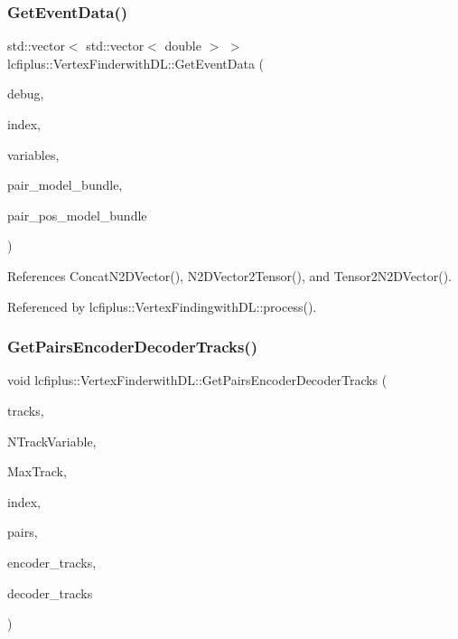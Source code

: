 \mbox{\label{namespacelcfiplus_1_1VertexFinderwithDL_a719656476002b2e8d4b42cecc8cee36d}} 
\subsubsection{Get\+Event\+Data()}
{\footnotesize\ttfamily std\+::vector$<$ std\+::vector$<$ double $>$ $>$ lcfiplus\+::\+Vertex\+Finderwith\+D\+L\+::\+Get\+Event\+Data (\begin{DoxyParamCaption}\item[{bool}]{debug,  }\item[{std\+::vector$<$ std\+::vector$<$ double $>$ $>$}]{index,  }\item[{std\+::vector$<$ std\+::vector$<$ double $>$ $>$}]{variables,  }\item[{tensorflow\+::\+Saved\+Model\+Bundle\+Lite \&}]{pair\+\_\+model\+\_\+bundle,  }\item[{tensorflow\+::\+Saved\+Model\+Bundle\+Lite \&}]{pair\+\_\+pos\+\_\+model\+\_\+bundle }\end{DoxyParamCaption})}



References Concat\+N2\+D\+Vector(), N2\+D\+Vector2\+Tensor(), and Tensor2\+N2\+D\+Vector().



Referenced by lcfiplus\+::\+Vertex\+Findingwith\+D\+L\+::process().

\mbox{\label{namespacelcfiplus_1_1VertexFinderwithDL_ab6f640b872cf305e92307523107e045e}} 
\subsubsection{Get\+Pairs\+Encoder\+Decoder\+Tracks()}
{\footnotesize\ttfamily void lcfiplus\+::\+Vertex\+Finderwith\+D\+L\+::\+Get\+Pairs\+Encoder\+Decoder\+Tracks (\begin{DoxyParamCaption}\item[{\textbf{ Track\+Vec} \&}]{tracks,  }\item[{int}]{N\+Track\+Variable,  }\item[{int}]{Max\+Track,  }\item[{std\+::vector$<$ std\+::vector$<$ double $>$ $>$ \&}]{index,  }\item[{std\+::vector$<$ std\+::vector$<$ double $>$ $>$ \&}]{pairs,  }\item[{std\+::vector$<$ std\+::vector$<$ double $>$ $>$ \&}]{encoder\+\_\+tracks,  }\item[{std\+::vector$<$ std\+::vector$<$ double $>$ $>$ \&}]{decoder\+\_\+tracks }\end{DoxyParamCaption})}



